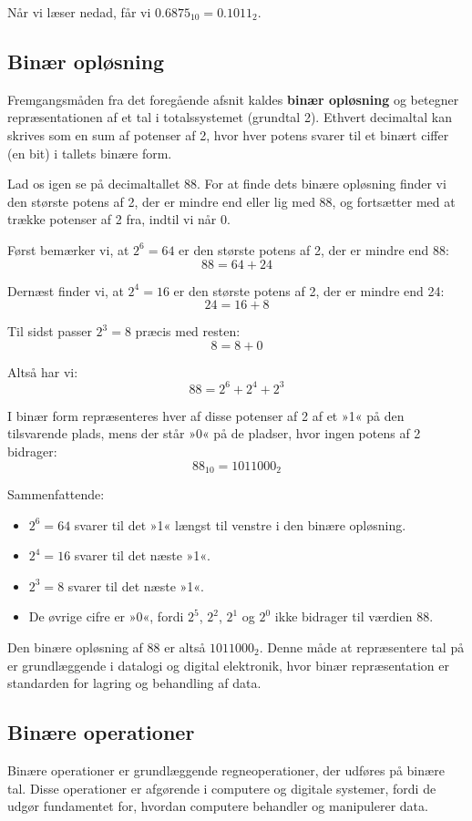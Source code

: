 Når vi læser nedad, får vi $0.6875_{10} = 0.1011_2$.

\subsection*{Binær opløsning}

Fremgangsmåden fra det foregående afsnit kaldes \textbf{binær opløsning} og betegner repræsentationen af et tal i totalssystemet (grundtal 2). Ethvert decimaltal kan skrives som en sum af potenser af 2, hvor hver potens svarer til et binært ciffer (en bit) i tallets binære form.

Lad os igen se på decimaltallet 88. For at finde dets binære opløsning finder vi den største potens af 2, der er mindre end eller lig med 88, og fortsætter med at trække potenser af 2 fra, indtil vi når 0.

Først bemærker vi, at $2^6 = 64$ er den største potens af 2, der er mindre end 88:
\[
88 = 64 + 24
\]

Dernæst finder vi, at $2^4 = 16$ er den største potens af 2, der er mindre end 24:
\[
24 = 16 + 8
\]

Til sidst passer $2^3 = 8$ præcis med resten:
\[
8 = 8 + 0
\]

Altså har vi:
\[
88 = 2^6 + 2^4 + 2^3
\]

I binær form repræsenteres hver af disse potenser af 2 af et »1« på den tilsvarende plads, mens der står »0« på de pladser, hvor ingen potens af 2 bidrager:
\[
88_{10} = 1011000_2
\]

Sammenfattende:
\begin{itemize}
    \item $2^6 = 64$ svarer til det »1« længst til venstre i den binære opløsning.
    \item $2^4 = 16$ svarer til det næste »1«.
    \item $2^3 = 8$ svarer til det næste »1«.
    \item De øvrige cifre er »0«, fordi $2^5$, $2^2$, $2^1$ og $2^0$ ikke bidrager til værdien 88.
\end{itemize}

Den binære opløsning af 88 er altså $1011000_2$. Denne måde at repræsentere tal på er grundlæggende i datalogi og digital elektronik, hvor binær repræsentation er standarden for lagring og behandling af data.

\subsection*{Binære operationer}
Binære operationer er grundlæggende regneoperationer, der udføres på binære tal. Disse operationer er afgørende i computere og digitale systemer, fordi de udgør fundamentet for, hvordan computere behandler og manipulerer data.

